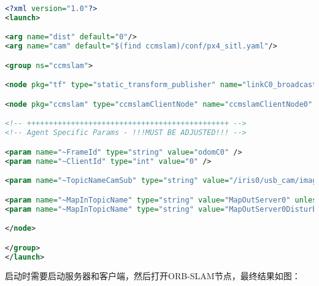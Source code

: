 \begin{lstlisting}[language={XML}]
<?xml version="1.0"?>
<launch>

<arg name="dist" default="0"/>
<arg name="cam" default="$(find ccmslam)/conf/px4_sitl.yaml"/>

<group ns="ccmslam">

<node pkg="tf" type="static_transform_publisher" name="linkC0_broadcaster" args="-100 300 5 -1.571 0 -2 world odomC0 100" /> 

<node pkg="ccmslam" type="ccmslamClientNode" name="ccmslamClientNode0" args="$(find ccmslam)/conf/ORBvoc.txt $(arg cam)" output="screen">

<!-- ++++++++++++++++++++++++++++++++++++++++++++++ -->
<!-- Agent Specific Params - !!!MUST BE ADJUSTED!!! -->

<param name="~FrameId" type="string" value="odomC0" />
<param name="~ClientId" type="int" value="0" />

<param name="~TopicNameCamSub" type="string" value="/iris0/usb_cam/image_raw" />

<param name="~MapInTopicName" type="string" value="MapOutServer0" unless="$(arg dist)" />
<param name="~MapInTopicName" type="string" value="MapOutServer0Disturbed" if="$(arg dist)" /> 

</node>

</group>
</launch>
\end{lstlisting}

启动时需要启动服务器和客户端，然后打开ORB-SLAM节点，最终结果如图：




































